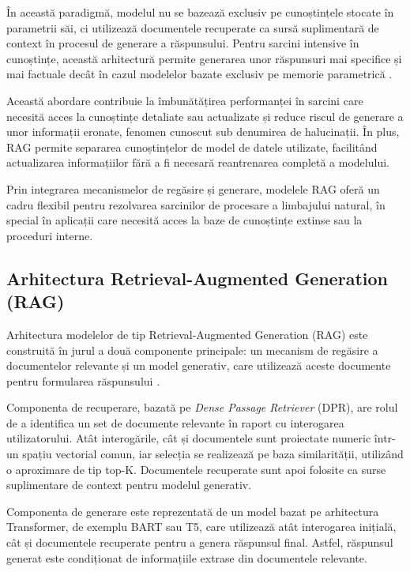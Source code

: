 \documentclass[12pt, a4paper, oneside, romanian]{teza-upb}
\begin{document}
În această paradigmă, modelul nu se bazează exclusiv pe cunoștințele stocate în parametrii săi, ci utilizează documentele recuperate ca sursă suplimentară de context în procesul de generare a răspunsului. Pentru sarcini intensive în cunoștințe, această arhitectură permite generarea unor răspunsuri mai specifice și mai factuale decât în cazul modelelor bazate exclusiv pe memorie parametrică \cite{lewis2020retrieval}.

Această abordare contribuie la îmbunătățirea performanței în sarcini care necesită acces la cunoștințe detaliate sau actualizate și reduce riscul de generare a unor informații eronate, fenomen cunoscut sub denumirea de halucinații. În plus, RAG permite separarea cunoștințelor de model de datele utilizate, facilitând actualizarea informațiilor fără a fi necesară reantrenarea completă a modelului.

Prin integrarea mecanismelor de regăsire și generare, modelele RAG oferă un cadru flexibil pentru rezolvarea sarcinilor de procesare a limbajului natural, în special în aplicații care necesită acces la baze de cunoștințe extinse \cite{lewis2020retrieval} sau la proceduri interne.


\subsection{Arhitectura Retrieval-Augmented Generation (RAG)}

Arhitectura modelelor de tip Retrieval-Augmented Generation (RAG) este construită în jurul a două componente principale: un mecanism de regăsire a documentelor relevante și un model generativ, care utilizează aceste documente pentru formularea răspunsului \cite{lewis2020retrieval}.

Componenta de recuperare, bazată pe \textit{Dense Passage Retriever} (DPR), are rolul de a identifica un set de documente relevante în raport cu interogarea utilizatorului. Atât interogările, cât și documentele sunt proiectate numeric într-un spațiu vectorial comun, iar selecția se realizează pe baza similarității, utilizând o aproximare de tip top-K. Documentele recuperate sunt apoi folosite ca surse suplimentare de context pentru modelul generativ.

Componenta de generare este reprezentată de un model bazat pe arhitectura Transformer, de exemplu BART sau T5, care utilizează atât interogarea inițială, cât și documentele recuperate pentru a genera răspunsul final. Astfel, răspunsul generat este condiționat de informațiile extrase din documentele relevante.
\end{document}
